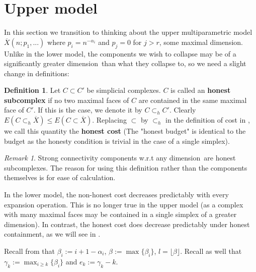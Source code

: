 \documentclass{article}
\theoremstyle{plain}
\theoremstyle{definition}
\newtheorem{definition}[theorem]{Definition}
\theoremstyle{remark}
\newtheorem{remark}[theorem]{Remark}
\newcommand{\di}{dimension}
\begin{document}
\section{Upper model}\label{chap:Upper}
In this section we transition to thinking about the upper multiparametric model $\overline{X}(n;p_1,...)$ where $p_i=n^{-\alpha_i}$ and $p_j=0$ for $j>r$, some maximal \di.
Unlike in the lower model, the components we wish to collapse may be of a significantly greater \di\ than what they collapse to, so we need a slight change in definitions:
\begin{definition}
    Let $C\subset C'$ be simplicial complexes. $C$ is called an \textbf{honest subcomplex} if no two maximal faces of $C$ are contained in the same maximal face of $C'$.
    If this is the case, we denote it by $C\subset_h C'$. Clearly $E(C\subset_h \overline{X})\le E(C\subset \overline{X})$. Replacing $\subset$ by $\subset_h$ in the definition of cost in , we call this quantity the \textbf{honest cost} (The "honest budget" is identical to the budget as the honesty condition is trivial in the case of a single simplex).
\end{definition}
\begin{remark}
    Strong connectivity components w.r.t any \di \ are honest subcomplexes. The reason for using this definition rather than the components themselves is for ease of calculation.

    In the lower model, the non-honest cost decreases predictably with every expansion operation. This is no longer true in the upper model (as a complex with many maximal faces may be contained in a single simplex of a greater \di).
    In contrast, the honest cost does decrease predictably under honest containment, as we will see in .
\end{remark}

Recall from  that $\beta_i:=i+1-\alpha_i$, $\beta:=\max\{\beta_i\}$, $l=\lfloor\beta \rfloor$. Recall as well that $\gamma_k:=\max_{i\ge k}\{\beta_i\}$ and $e_k:=\gamma_k-k$.
\end{document}
